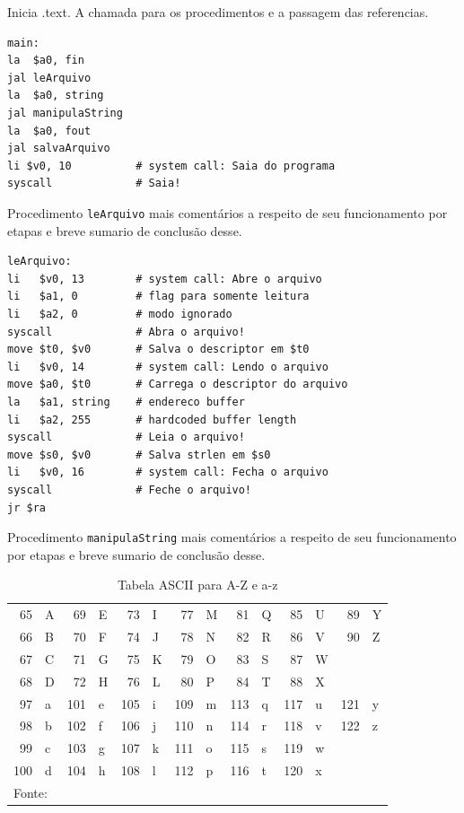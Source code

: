 \documentclass[12pt,a4paper]{article}
\numberwithin{figure}{section}
\numberwithin{table}{section}
\begin{document}
Inicia .text. A chamada para os procedimentos e a passagem das referencias.

\vspace{-0.5cm}
\begin{lstlisting}[caption={main}]
main:
la  $a0, fin
jal leArquivo
la  $a0, string
jal manipulaString
la  $a0, fout
jal salvaArquivo
li $v0, 10          # system call: Saia do programa
syscall             # Saia!
\end{lstlisting}

Procedimento \texttt{leArquivo} mais comentários a respeito de seu funcionamento por etapas e breve sumario de conclusão desse.

\vspace{-0.5cm}
\begin{lstlisting}[caption={leArquivo}]
leArquivo:
li   $v0, 13        # system call: Abre o arquivo
li   $a1, 0         # flag para somente leitura
li   $a2, 0         # modo ignorado
syscall             # Abra o arquivo!
move $t0, $v0       # Salva o descriptor em $t0
li   $v0, 14        # system call: Lendo o arquivo
move $a0, $t0       # Carrega o descriptor do arquivo
la   $a1, string    # endereco buffer
li   $a2, 255       # hardcoded buffer length
syscall             # Leia o arquivo!
move $s0, $v0       # Salva strlen em $s0
li   $v0, 16        # system call: Fecha o arquivo
syscall             # Feche o arquivo!
jr $ra
\end{lstlisting}


Procedimento \texttt{manipulaString} mais comentários a respeito de seu funcionamento por etapas e breve sumario de conclusão desse.

\lipsum[1]

\begin{table}[H]
	\renewcommand{\arraystretch}{1}
	\centering
	\caption{Tabela ASCII para A-Z e a-z}
	\label{tab:ascii}
	\begin{tabular}{rl|rl|rl|rl|rl|rl|rl}
		\toprule
		 65 & A &  69 & E &  73 & I &  77 & M &  81 & Q &  85 & U &  89 & Y \\
		 66 & B &  70 & F &  74 & J &  78 & N &  82 & R &  86 & V &  90 & Z \\
		 67 & C &  71 & G &  75 & K &  79 & O &  83 & S &  87 & W &     &   \\
		 68 & D &  72 & H &  76 & L &  80 & P &  84 & T &  88 & X &     &   \\
		\midrule
		 97 & a & 101 & e & 105 & i & 109 & m & 113 & q & 117 & u & 121 & y \\
		 98 & b & 102 & f & 106 & j & 110 & n & 114 & r & 118 & v & 122 & z \\
		 99 & c & 103 & g & 107 & k & 111 & o & 115 & s & 119 & w &     &   \\
		100 & d & 104 & h & 108 & l & 112 & p & 116 & t & 120 & x &     &   \\
		\bottomrule
		\multicolumn{12}{l}{\footnotesize Fonte: \citet*{wiki:xxx}}
	\end{tabular}
\end{table}
\end{document}

